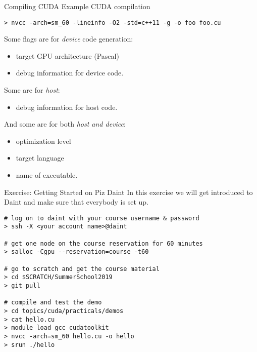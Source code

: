 \documentclass[aspectratio=43]{beamer}
\begin{document}
\begin{frame}[fragile]{Compiling CUDA}
    Example CUDA compilation
    \begin{terminal}{}
    \begin{lstlisting}[style=terminal]
> nvcc -arch=sm_60 -lineinfo -O2 -std=c++11 -g -o foo foo.cu
    \end{lstlisting}
    \end{terminal}
    Some flags are for \emph{device} code generation:
    \begin{itemize}
        \item {} target GPU architecture (Pascal)
        \item {} debug information for device code.
    \end{itemize}
    Some are for \emph{host}:
    \begin{itemize}
        \item {} debug information for host code.
    \end{itemize}
    And some are for both \emph{host and device}:
    \begin{itemize}
        \item {} optimization level
        \item {} target language
        \item {} name of executable.
    \end{itemize}
\end{frame}

\begin{frame}[fragile]{Exercise: Getting Started on Piz Daint}
    In this exercise we will get introduced to Daint and make sure that everybody is set up.

    \begin{terminal}{}
        \begin{lstlisting}[style=terminal]
# log on to daint with your course username & password
> ssh -X <your account name>@daint

# get one node on the course reservation for 60 minutes
> salloc -Cgpu --reservation=course -t60

# go to scratch and get the course material
> cd $SCRATCH/SummerSchool2019
> git pull

# compile and test the demo
> cd topics/cuda/practicals/demos
> cat hello.cu
> module load gcc cudatoolkit
> nvcc -arch=sm_60 hello.cu -o hello
> srun ./hello
        \end{lstlisting}
    \end{terminal}
\end{frame}
\end{document}
